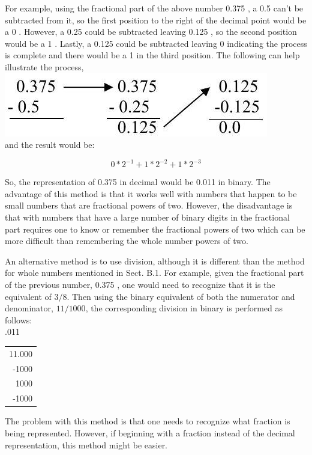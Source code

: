 \documentclass[10pt]{article}
\begin{document}
For example, using the fractional part of the above number 0.375 , a 0.5 can't be subtracted from it, so the first position to the right of the decimal point would be a 0 . However, a 0.25 could be subtracted leaving 0.125 , so the second position would be a 1 . Lastly, a 0.125 could be subtracted leaving 0 indicating the process is complete and there would be a 1 in the third position. The following can help illustrate the process,\\
\includegraphics[max width=\textwidth, center]{2025_03_24_ebe50cc223a6fbc49eecg-318}\\
and the result would be:

$$
0 * 2^{-1}+1 * 2^{-2}+1 * 2^{-3}
$$

So, the representation of 0.375 in decimal would be 0.011 in binary. The advantage of this method is that it works well with numbers that happen to be small numbers that are fractional powers of two. However, the disadvantage is that with numbers that have a large number of binary digits in the fractional part requires one to know or remember the fractional powers of two which can be more difficult than remembering the whole number powers of two.

An alternative method is to use division, although it is different than the method for whole numbers mentioned in Sect. B.1. For example, given the fractional part of the previous number, 0.375 , one would need to recognize that it is the equivalent of $3 / 8$. Then using the binary equivalent of both the numerator and denominator, $11 / 1000$, the corresponding division in binary is performed as follows:\\
.011

\begin{center}
\begin{tabular}{r}
11.000 \\
-1000 \\
\hline
1000 \\
-1000 \\
\hline
\end{tabular}
\end{center}

The problem with this method is that one needs to recognize what fraction is being represented. However, if beginning with a fraction instead of the decimal representation, this method might be easier.
\end{document}
